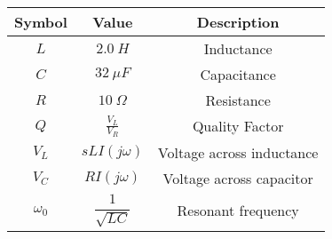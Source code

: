 

\begin{tabular}{|c|c|c|}
    \hline
     \textbf{Symbol} & \textbf{Value} &
     \textbf{Description}\\
    \hline
     $L$ &  $2.0\ H$ & Inductance\\[6pt]
    \hline 
     $C$ &  $32\ \mu F$ & Capacitance \\[6pt]
    \hline
     $R$ &  $10\ \Omega$ & Resistance\\[6pt]
    \hline
     $Q$ & $\frac{V_L}{V_R}$ & Quality Factor\\[6pt]
    \hline
    $V_L$ & $sLI(j\omega)$ & Voltage across inductance\\[6pt]
    \hline
    $V_C$ & $RI(j\omega)$ & Voltage across capacitor\\[6pt]
    \hline
    $\omega_0$ & $\dfrac{1}{\sqrt{LC}}$ & Resonant frequency\\[6pt]
    \hline
\end{tabular}
